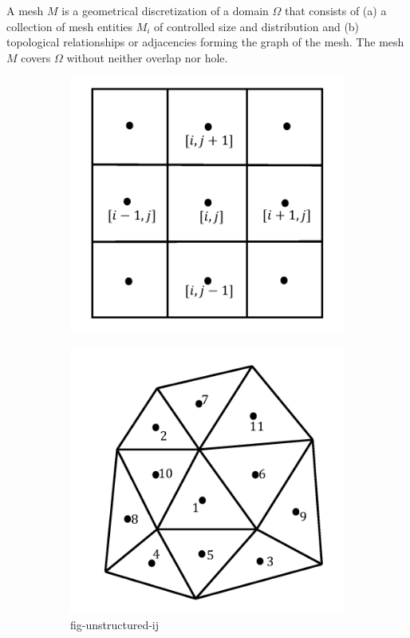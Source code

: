 \begin{definition}
A mesh $M$ is a geometrical discretization of a domain $\Omega$ that consists of (a) a collection of mesh entities $M_i$ of controlled size and distribution and (b) topological relationships or adjacencies forming the graph of the mesh. The mesh $M$ covers $\Omega$ without neither overlap nor hole.
\end{definition}

\begin{figure}
  \centering
  \begin{subfigure}{0.5\linewidth}
    \centering
    \includegraphics[width=0.8\linewidth]{img/intro/mStructured.png}
    \caption{}
    \label{fig-structured-ij}
  \end{subfigure}%
  \begin{subfigure}{0.5\linewidth}
    \centering
    \includegraphics[width=0.8\linewidth]{img/intro/mUnstructured.png}
    \caption{fig-unstructured-ij}
  \end{subfigure}%
  \caption{}
  \label{fig-structured-unstructured}
\end{figure}

